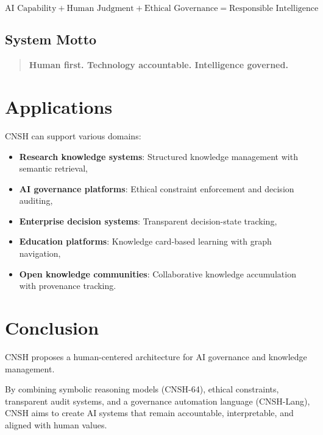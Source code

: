 \documentclass[conference]{IEEEtran}
\begin{document}
\begin{equation}
\text{AI Capability}
+ \text{Human Judgment}
+ \text{Ethical Governance}
= \text{Responsible Intelligence}
\label{eq:coreformula}
\end{equation}

\subsection{System Motto}

\begin{quote}
\textbf{Human first. Technology accountable. Intelligence governed.}
\end{quote}

\section{Applications}

CNSH can support various domains:

\begin{itemize}[nosep]
  \item \textbf{Research knowledge systems}: Structured knowledge
    management with semantic retrieval,
  \item \textbf{AI governance platforms}: Ethical constraint
    enforcement and decision auditing,
  \item \textbf{Enterprise decision systems}: Transparent
    decision-state tracking,
  \item \textbf{Education platforms}: Knowledge card-based
    learning with graph navigation,
  \item \textbf{Open knowledge communities}: Collaborative
    knowledge accumulation with provenance tracking.
\end{itemize}

\section{Conclusion}

CNSH proposes a human-centered architecture for AI governance
and knowledge management.

By combining symbolic reasoning models (CNSH-64), ethical
constraints, transparent audit systems, and a governance
automation language (CNSH-Lang), CNSH aims to create AI systems
that remain accountable, interpretable, and aligned with
human values.
\end{document}
